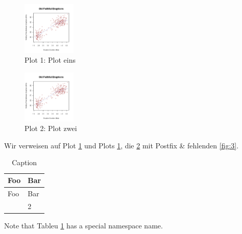\begin{figure}
\centering
\includegraphics[width=1in,height=\textheight]{img/fig-1.png}
\caption{Plot 1: Plot eins}\label{fig:1}
\end{figure}

\begin{figure}
\centering
\includegraphics[width=1in,height=\textheight]{img/fig-1.png}
\caption{Plot 2: Plot zwei}\label{fig:2}
\end{figure}

Wir verweisen auf Plot \ref{fig:1} und Plots \ref{fig:1}, die
\ref{fig:2} mit Postfix \& fehlenden \ref{fig:3}.

\begin{longtable}[]{@{}ll@{}}
\caption{Caption}\label{tbl:foobar}\tabularnewline
\toprule\noalign{}
Foo & Bar \\
\midrule\noalign{}
\endfirsthead
\toprule\noalign{}
Foo & Bar \\
\midrule\noalign{}
\endhead
\bottomrule\noalign{}
\endlastfoot
1 & 2 \\
\end{longtable}

Note that Tableu \ref{tbl:foobar} has a special namespace name.
